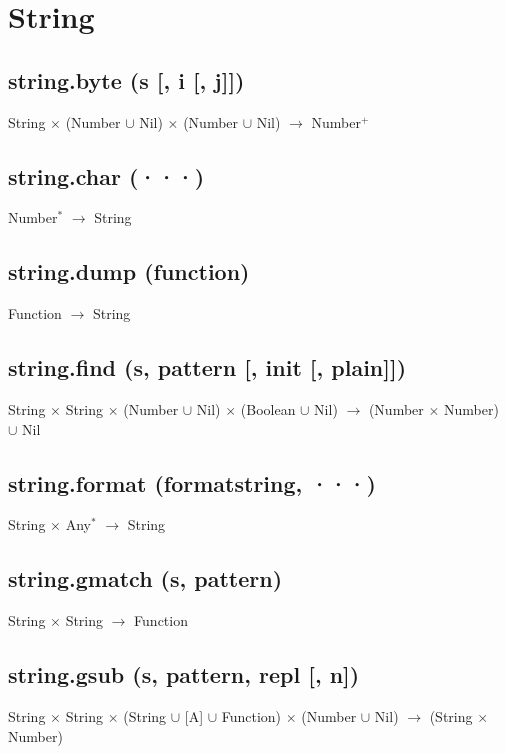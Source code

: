 \documentclass[12pt]{article}
\begin{document}
\section{String}

\subsection{string.byte (s [, i [, j]])}

String $\times$
(Number $\cup$ Nil) $\times$
(Number $\cup$ Nil) $\rightarrow$
Number$^+$

\subsection{string.char (···)}

Number$^*$ $\rightarrow$ String

\subsection{string.dump (function)}

Function $\rightarrow$ String

\subsection{string.find (s, pattern [, init [, plain]])}

String $\times$ String $\times$
(Number $\cup$ Nil) $\times$
(Boolean $\cup$ Nil) $\rightarrow$
(Number $\times$ Number) $\cup$ Nil

\subsection{string.format (formatstring, ···)}

String $\times$ Any$^*$ $\rightarrow$ String

\subsection{string.gmatch (s, pattern)}

String $\times$ String $\rightarrow$ Function

\subsection{string.gsub (s, pattern, repl [, n])}

String $\times$
String $\times$
(String $\cup$ [A] $\cup$ Function) $\times$
(Number $\cup$ Nil) $\rightarrow$
(String $\times$ Number)
\end{document}
